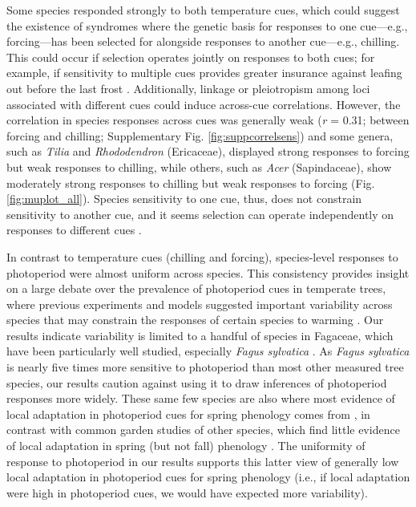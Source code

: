 \documentclass{article}
\begin{document}
Some species responded strongly to both temperature cues, which could suggest the existence of syndromes where the genetic basis for responses to one cue---e.g.,  forcing---has been selected for alongside responses to another cue---e.g., chilling. This could occur if selection operates jointly on responses to both cues; for example, if sensitivity to multiple cues provides greater insurance against leafing out before the last frost \citep{bonamour2019,memegan2021}. Additionally, linkage or pleiotropism among loci associated with different cues \citep{nakagawa2005} could induce across-cue correlations. However, the correlation in species responses across cues was generally weak (\emph{r} = 0.31; between forcing and chilling; Supplementary Fig. \ref{fig:suppcorrelsens}) and some genera, such as \emph{Tilia} and \emph{Rhododendron} (Ericaceae), displayed strong responses to forcing but weak responses to chilling, while others, such as \emph{Acer} (Sapindaceae), show moderately strong responses to chilling but weak responses to forcing (Fig. \ref{fig:muplot_all}). Species sensitivity to one cue, thus, does not constrain sensitivity to another cue, and it seems selection can operate independently on responses to different cues \citep{bonamour2019}.

In contrast to temperature cues (chilling and forcing), species-level responses to photoperiod were almost uniform across species. This consistency provides insight on a large debate over the prevalence of photoperiod cues in temperate trees, where previous experiments \citep{Basler:2012,zohner2016} and models \citep[e.g.,][]{Hunter:1992jw,schaber20203} suggested important variability across species that may constrain the responses of certain species to warming \citep{way2015}. Our results indicate variability is limited to a handful of species in Fagaceae, which have been particularly well studied, especially \emph{Fagus sylvatica} \citep[e.g.,][]{Basler:2012,zohner2016,kramer2017}. As \emph{Fagus sylvatica} is nearly five times more sensitive to photoperiod than most other measured tree species, our results caution against using it to draw inferences of photoperiod responses more widely. These same few species are also where most evidence of local adaptation in photoperiod cues for spring phenology comes from \citep[e.g.,][]{kramer2017}, in contrast with common garden studies of other species, which find little evidence of local adaptation in spring (but not fall) phenology \citep{aitken2016}. The uniformity of response to photoperiod in our results supports this latter view of generally low local adaptation in photoperiod cues for spring phenology (i.e., if local adaptation were high in photoperiod cues, we would have expected more variability). 
\end{document}
